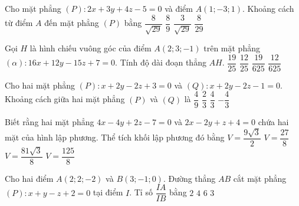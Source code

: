\begin{ex}%
	Cho mặt phẳng $(P)\colon 2x+3y+4z-5=0$ và điểm $A(1;-3;1)$. Khoảng cách từ điểm $A$ đến mặt phẳng $(P)$ bằng
	\choice
	{\True $\dfrac{8}{\sqrt{29}}$}
	{$\dfrac{8}{9}$}
	{$\dfrac{3}{\sqrt{29}}$}
	{$\dfrac{8}{29}$}
\end{ex}

\begin{ex}
	Gọi $H$ là hình chiếu vuông góc của điểm $A(2;3;-1)$ trên mặt phẳng $(\alpha)\colon 16x+12y-15z+7=0$. Tính độ dài đoạn thẳng $AH$.
	\choice
	{$\dfrac{19}{25}$}
	{\True $\dfrac{12}{25}$}
	{$\dfrac{19}{625}$}
	{$\dfrac{12}{625}$}
\end{ex}

\begin{ex}%
	Cho hai mặt phẳng $(P)\colon x+2y-2z+3=0$ và $(Q)\colon x+2y-2z-1=0$. Khoảng cách giữa hai mặt phẳng $(P)$ và $(Q)$ là 
	\choice 
	{$\dfrac{4}{9}$}
	{$\dfrac{2}{3}$}
	{\True $\dfrac{4}{3}$}
	{$-\dfrac{4}{3}$}
	
\end{ex}

\begin{ex}
	Biết rằng hai mặt phẳng $4x-4y+2z-7=0$ và $2x-2y+z+4=0$ chứa hai mặt của hình lập phương. Thể tích khối lập phương đó bằng
	\choice
	{$V=\dfrac{9 \sqrt{3}}{2}$}
	{$V=\dfrac{27}{8}$}
	{$V=\dfrac{81 \sqrt{3}}{8}$}
	{\True $V=\dfrac{125}{8}$}
\end{ex}

\begin{ex}
	Cho hai điểm $A(2;2;-2)$ và $B(3;-1;0)$. Đường thẳng $AB$ cắt mặt phẳng $(P)\colon x+y-z+2=0$ tại điểm $I$. Tỉ số $\dfrac{IA}{IB}$ bằng
	\choice
	{\True $2$}
	{$4$}
	{$6$}
	{$3$}
\end{ex}

